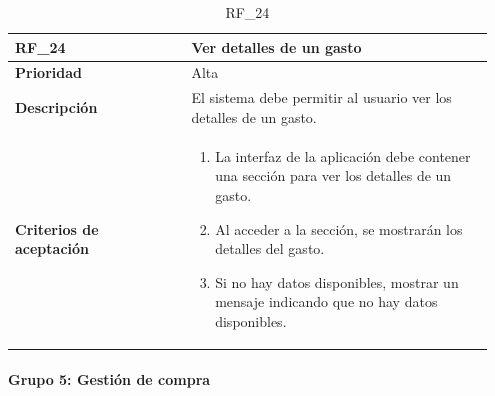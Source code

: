 \begin{table}[htb!]
    \begin{tabular}{|p{0.35\linewidth}|p{0.6\linewidth}|}
        \hline
        \rowcolor[HTML]{C0C0C0}  
        \textbf{RF\_24} & \textbf{Ver detalles de un gasto} \\
        \hline
        \textbf{Prioridad} & Alta \\
        \hline
        \textbf{Descripción} & El sistema debe permitir al usuario ver los detalles de un gasto.  \\
        \hline
        \vspace{0.5mm}
        \textbf{Criterios de aceptación} & 
        \begin{minipage}[t]{0.9\linewidth}
            \begin{enumerate}
                \item La interfaz de la aplicación debe contener una sección para ver los detalles de un gasto.
                \item Al acceder a la sección, se mostrarán los detalles del gasto.
                \item Si no hay datos disponibles, mostrar un mensaje indicando que no hay datos disponibles.
            \end{enumerate}
            \vspace{2mm}
        \end{minipage} \\
        \hline
    \end{tabular}
    \caption{RF\_24}
    \label{req:RF24}
\end{table}
\clearpage




\paragraph{Grupo 5: Gestión de compra}
\label{subsubsec:grupo5}

\parbox{\textwidth}{ 
   
}

